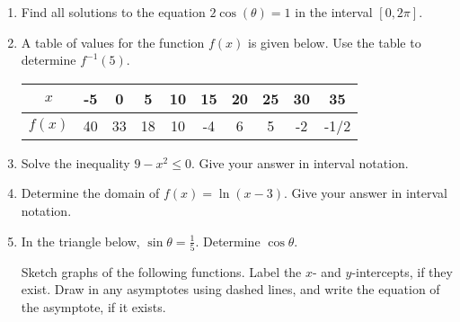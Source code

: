 \documentclass[12pt]{article}
\begin{document}
\begin{enumerate}
\item Find all solutions to the equation $2\cos (\theta) = 1$ in the interval $[0, 2 \pi].$\\


\quad \hfill \underline{\hspace{2in}}
\vfill


\item A table of values for the function $f(x)$ is given below. Use the table to determine $f^{-1}(5).$

\begin{tabular}{|c||c|c|c|c|c|c|c|c|c|}
$x$&-5&0&5&10&15&20&25&30&35\\
\hline
$f(x)$&40&33&18&10&-4&6&5&-2&-1/2\\
\end{tabular}

\quad \hfill \underline{\hspace{2in}}
\vspace{.2in}

\item Solve the inequality $9-x^2\leq 0.$ Give your answer in interval notation.\\
\quad

\quad \hfill \underline{\hspace{2in}}
\vfill


\item Determine the domain of $f(x)=\ln(x-3).$ Give your answer in interval notation.\\
\quad

\quad \hfill \underline{\hspace{2in}}
\vfill


 \item In the triangle below, $\sin \theta = \frac{1}{5}.$ Determine $\cos \theta.$ \\ 
 
 \hfill \underline{\hspace{2in}}
\newpage
Sketch graphs of the following functions. Label the $x$- and $y$-intercepts, if they exist. Draw in any asymptotes using dashed lines, and write the equation of the asymptote, if it exists.
\begin{multicols}{2}{
      \vspace*{-0.45in}

}
\end{multicols}
\end{enumerate}
\end{document}
